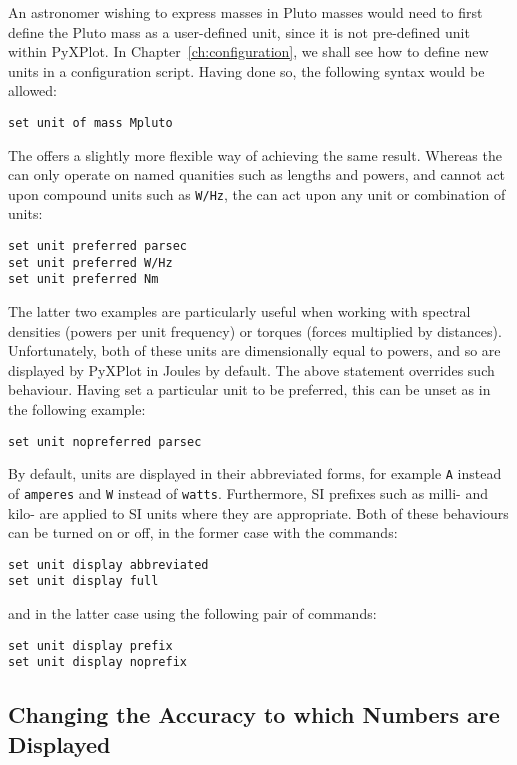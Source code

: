 An astronomer wishing to express masses in Pluto masses would need to first
define the Pluto mass as a user-defined unit, since it is not pre-defined unit
within PyXPlot. In Chapter~\ref{ch:configuration}, we shall see how to define
new units in a configuration script. Having done so, the following syntax would
be allowed:
\begin{verbatim}
set unit of mass Mpluto
\end{verbatim}

The  offers a slightly more flexible way of
achieving the same result. Whereas the  can only operate
on named quanities such as lengths and powers, and cannot act upon compound
units such as {\tt W/Hz}, the  can act upon any
unit or combination of units:
\begin{verbatim}
set unit preferred parsec
set unit preferred W/Hz
set unit preferred Nm
\end{verbatim}
The latter two examples are particularly useful when working with spectral
densities (powers per unit frequency) or torques (forces multiplied by
distances). Unfortunately, both of these units are dimensionally equal to
powers, and so are displayed by PyXPlot in Joules by default. The above
statement overrides such behaviour. Having set a particular unit to be
preferred, this can be unset as in the following example:
\begin{verbatim}
set unit nopreferred parsec
\end{verbatim}

By default, units are displayed in their abbreviated forms, for example {\tt A}
instead of {\tt amperes} and {\tt W} instead of {\tt watts}. Furthermore, SI
prefixes such as milli- and kilo- are applied to SI units where they are
appropriate. Both of these
behaviours can be turned on or off, in the former case with the commands:

\begin{verbatim}
set unit display abbreviated
set unit display full
\end{verbatim}

\noindent and in the latter case using the following pair of commands:

\begin{verbatim}
set unit display prefix
set unit display noprefix
\end{verbatim}

\subsection{Changing the Accuracy to which Numbers are Displayed}

